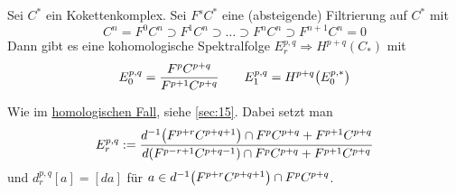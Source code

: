 \begin{satz}[{name={Kohomologische Spektralfolge einer Filtrierung}}]
	Sei $C^*$ ein Kokettenkomplex.
	Sei $F^s C^*$ eine (absteigende) Filtrierung auf $C^*$ mit
	\[
		C^n =F^0 C^n \supset F^1C^n \supset \ldots \supset F^nC^n \supset F^{n+1} C^n=0
	\]
	Dann gibt es eine kohomologische Spektralfolge
	\(
		E^{p,q}_r \Rightarrow H^{p+q}(C_*)
	\)
	mit 
	\[
		E_0^{p,q}= \frac{F^pC^{p+q}}{F^{p+1}C^{p+q}} \qquad E^{p,q}_1 = H^{p+q}\enbrace*{E_0^{p,*}}
	\]
\end{satz}
\begin{beweis}
	Wie im \hyperref[satz:spektralfolge_filtrierung]{homologischen Fall}, siehe \cref{sec:15}.
	Dabei setzt man 
	\[
		E^{p,q}_r := \frac{d^{-1} \enbrace*{F^{p+r}C^{p+q+1}} \cap F^pC^{p+q} + F^{p+1}C^{p+q}}{d \enbrace*{F^{p-r+1} C^{p+q-1}} \cap F^p C^{p+q} + F^{p+1}C^{p+q}} 
	\]
	und $d^{p,q}_r[a]=[d a]$ für $a \in d^{-1} \enbrace*{F^{p+r}C^{p+q+1}} \cap F^pC^{p+q}$.
\end{beweis}

